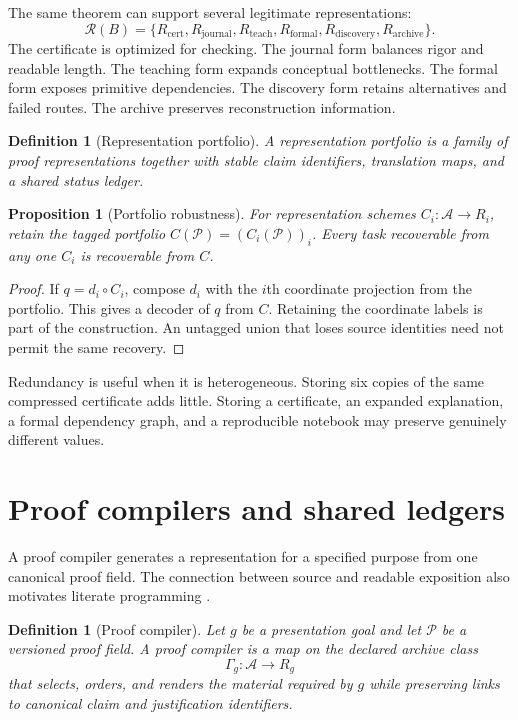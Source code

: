 \documentclass[11pt,oneside]{article}
\theoremstyle{komorebiplain}
\newtheorem{proposition}[theorem]{Proposition}
\theoremstyle{komorebidefinition}
\newtheorem{definition}[theorem]{Definition}
\theoremstyle{komorebiremark}
\newcommand{\Pcal}{\mathcal P}
\newcommand{\Rcal}{\mathcal R}
\begin{document}
The same theorem can support several legitimate representations:
\[
\Rcal(B)=
\{R_{\mathrm{cert}},R_{\mathrm{journal}},R_{\mathrm{teach}},
R_{\mathrm{formal}},R_{\mathrm{discovery}},R_{\mathrm{archive}}\}.
\]
The certificate is optimized for checking. The journal form balances rigor and readable length. The teaching form expands conceptual bottlenecks. The formal form exposes primitive dependencies. The discovery form retains alternatives and failed routes. The archive preserves reconstruction information.

\begin{definition}[Representation portfolio]
\label{res:11:1}
A representation portfolio is a family of proof representations together with stable claim identifiers, translation maps, and a shared status ledger.
\end{definition}

\begin{proposition}[Portfolio robustness]
\label{res:11:2}
For representation schemes $C_i:\mathscr A\to R_i$, retain the tagged portfolio $C(\Pcal)=(C_i(\Pcal))_i$. Every task recoverable from any one $C_i$ is recoverable from $C$.
\end{proposition}

\begin{proof}
If $q=d_i\circ C_i$, compose $d_i$ with the $i$th coordinate projection from the portfolio. This gives a decoder of $q$ from $C$. Retaining the coordinate labels is part of the construction. An untagged union that loses source identities need not permit the same recovery.
\end{proof}

Redundancy is useful when it is heterogeneous. Storing six copies of the same compressed certificate adds little. Storing a certificate, an expanded explanation, a formal dependency graph, and a reproducible notebook may preserve genuinely different values.


\section{Proof compilers and shared ledgers}
\label{sec:old12}

A proof compiler generates a representation for a specified purpose from one canonical proof field. The connection between source and readable exposition also motivates literate programming \cite{knuth}.

\begin{definition}[Proof compiler]
\label{res:12:1}
Let $g$ be a presentation goal and let $\Pcal$ be a versioned proof field. A proof compiler is a map on the declared archive class
\[
\Gamma_g:\mathscr A\longrightarrow R_g
\]
that selects, orders, and renders the material required by $g$ while preserving links to canonical claim and justification identifiers.
\end{definition}
\end{document}
